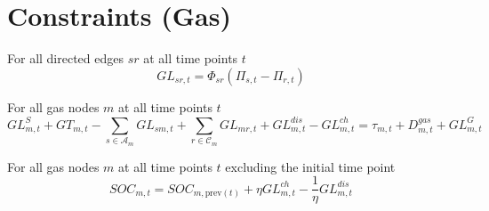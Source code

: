 \documentclass{article}
\def\sC{\mathcal C}
\def\sA{\mathcal A}
\begin{document}
\section{Constraints (Gas)}
For all directed edges $sr$ at all time points $t$
\begin{equation}
  GL_{sr,t} = \Phi_{sr}(\Pi_{s,t} - \Pi_{r,t})
\end{equation}

For all gas nodes $m$ at all time points $t$
\begin{equation}
  GL^S_{m,t} + GT_{m,t} - \sum_{s\in \sA_m}{GL_{sm,t}} + \sum_{r\in \sC_m}{GL_{mr,t}}
  + GL^{dis}_{m,t} - GL^{ch}_{m,t} =
  \tau_{m,t} + D^{gas}_{m,t} + GL^G_{m,t}
\end{equation}

For all gas nodes $m$ at all time points $t$ excluding the initial time point
\begin{equation}
  SOC_{m,t} = SOC_{m,\text{prev}(t)} + \eta GL^{ch}_{m,t} - \frac{1}{\eta} GL^{dis}_{m,t}
\end{equation}
\end{document}
